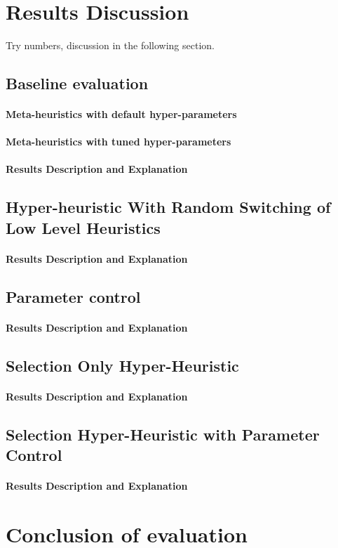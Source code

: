\section{Results Discussion}
Try numbers, discussion in the following section.

\subsection{Baseline evaluation}

\paragraph{Meta-heuristics with default hyper-parameters}

\paragraph{Meta-heuristics with tuned hyper-parameters}

\paragraph{Results Description and Explanation}


\subsection{Hyper-heuristic With Random Switching of Low Level Heuristics}

\paragraph{Results Description and Explanation}


\subsection{Parameter control}

\paragraph{Results Description and Explanation}


\subsection{Selection Only Hyper-Heuristic}

\paragraph{Results Description and Explanation}


\subsection{Selection Hyper-Heuristic with Parameter Control}

\paragraph{Results Description and Explanation}

\section{Conclusion of evaluation}
